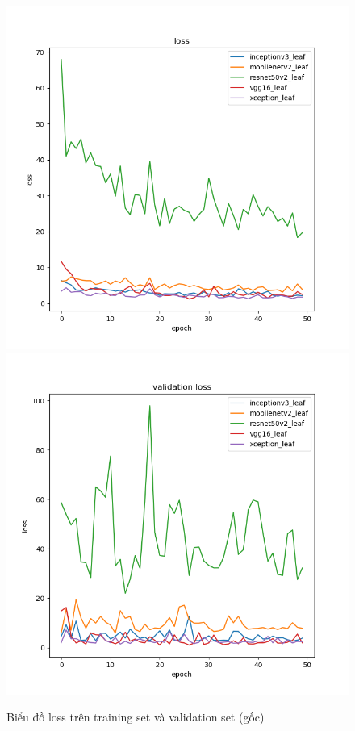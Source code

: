 \documentclass[a4paper,14pt]{extarticle}
\begin{document}
		\begin{figure}[H]
			\centering
			\includegraphics[scale=0.4]{images/leaf_loss.png}
			\includegraphics[scale=0.4]{images/leaf_val_loss.png}
			\caption{Biểu đồ loss trên training set và validation set (gốc)}
		\end{figure}
		
\end{document}
